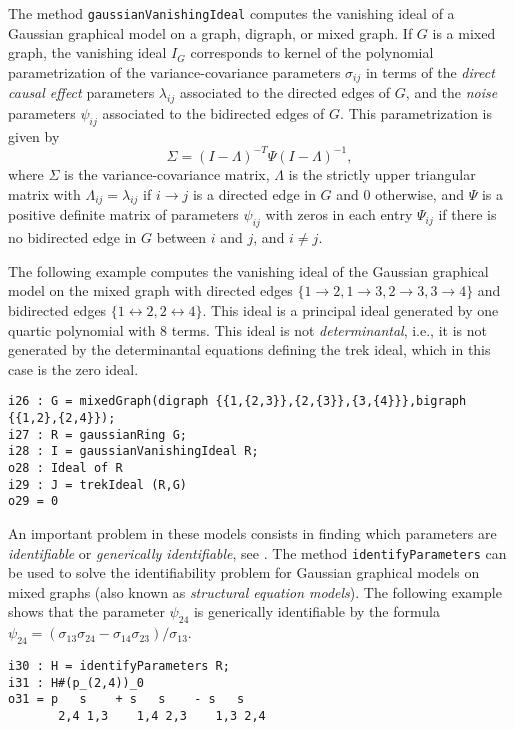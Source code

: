 \documentclass[letterpaper]{article}
\theoremstyle{definition}
\begin{document}
The method {\tt gaussianVanishingIdeal} computes the vanishing ideal of a
Gaussian graphical model on a graph, digraph, or mixed graph. If $G$ is a mixed
graph, 
the vanishing ideal $I_{G}$ corresponds to kernel of the polynomial parametrization of the
variance-covariance parameters  $\sigma_{ij}$ in terms of the \emph{direct
  causal effect} parameters $\lambda_{ij}$ associated to the directed edges of $G$,   
and the \emph{noise} parameters $\psi_{ij}$ associated to the
bidirected edges of $G$. This parametrization is  given by
\[\Sigma = (I - \Lambda)^{-T}\Psi(I-\Lambda)^{-1},\] 
where $\Sigma$ is the variance-covariance matrix, $\Lambda$ is the strictly
upper triangular matrix with $\Lambda_{ij} = \lambda_{ij}$ if $i\to j$ is a
directed edge in $G$ and 0 otherwise, and $\Psi$ is a positive definite
matrix of parameters $\psi_{ij}$ with zeros in each entry $\Psi_{ij}$ if there is no
bidirected edge in $G$ between $i$ and $j$, and $i\neq j$.

The following example computes the vanishing ideal of the Gaussian graphical
model  on the mixed graph with directed edges
$\{1\to 2, 1\to 3, 2\to 3, 3\to 4\}$ and bidirected edges $\{1 \leftrightarrow 2, 2 \leftrightarrow
4\}$. This ideal is a principal ideal generated by one quartic polynomial with 8
terms. This ideal is not \emph{determinantal}, i.e., it is not generated by the
determinantal equations defining 
the trek ideal, which in this case is the zero ideal.


\begin{verbatim}
i26 : G = mixedGraph(digraph {{1,{2,3}},{2,{3}},{3,{4}}},bigraph {{1,2},{2,4}});
i27 : R = gaussianRing G;
i28 : I = gaussianVanishingIdeal R;
o28 : Ideal of R
i29 : J = trekIdeal (R,G)
o29 = 0
\end{verbatim}

An important problem in these models consists in finding which parameters are
\emph{identifiable} or \emph{generically identifiable}, see \cite{GPSS}. The method
\texttt{identifyParameters} can be used to solve the identifiability problem for
Gaussian graphical  models on mixed graphs (also known as \emph{structural
  equation models}). The following example shows that the parameter
$\psi_{24}$ is generically identifiable by the formula $\psi_{24} =
(\sigma_{13}\sigma_{24} - \sigma_{14}\sigma_{23})/ \sigma_{13}$. 

\begin{verbatim}
i30 : H = identifyParameters R;
i31 : H#(p_(2,4))_0
o31 = p   s    + s   s    - s   s
       2,4 1,3    1,4 2,3    1,3 2,4
\end{verbatim}
\end{document}
